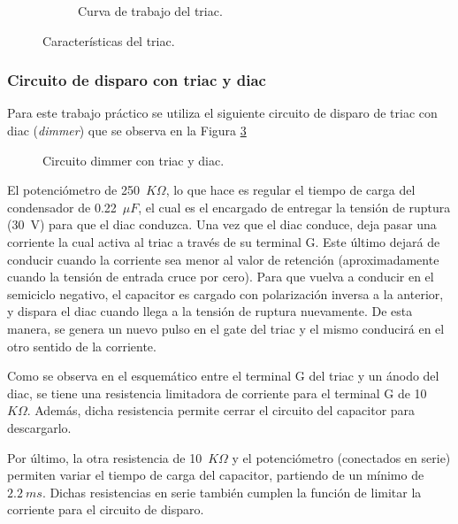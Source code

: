 \begin{figure}[H]
\begin{subfigure}[ht]{0.48\textwidth}
              \caption{Curva de trabajo del triac.}
              \label{fig:CurvaTriac}
            \end{subfigure}  
            \caption{Características del triac.}
            \label{fig:DatosTriac}
        \end{figure}

    \subsubsection{Circuito de disparo con triac y diac}
        
        Para este trabajo práctico se utiliza el siguiente circuito de disparo 
        de triac con diac (\textit{dimmer}) que se observa en la Figura 
        \ref{fig:CircuitoTriacDiac}

        \begin{figure}[H]
            \centering
            \caption{Circuito dimmer con triac y diac.}
            \label{fig:CircuitoTriacDiac}
          \end{figure}

        El potenciómetro de 250~\(K\Omega\), lo que hace es regular el tiempo de carga del condensador 
        de 0.22~\(\mu F\), el cual es el encargado de entregar la tensión de ruptura (30~V) 
        para que el diac conduzca. Una vez que el diac conduce, deja pasar una corriente 
        la cual activa al triac a través de su terminal G. Este último dejará de conducir 
        cuando la corriente sea menor al valor de retención (aproximadamente cuando la 
        tensión de entrada cruce por cero).
        Para que vuelva a conducir en el semiciclo negativo, el capacitor es cargado con
        polarización inversa a la anterior, y dispara el diac cuando llega a la tensión 
        de ruptura nuevamente. De esta manera, se genera un nuevo pulso en el gate del 
        triac y el mismo conducirá en el otro sentido de la corriente.

        Como se observa en el esquemático entre el terminal G del triac y un ánodo del diac, 
        se tiene una resistencia limitadora de corriente para el terminal G de 10~\(K\Omega\).
        Además, dicha resistencia permite cerrar el circuito del capacitor para descargarlo.

        Por último, la otra resistencia de 10~\(K\Omega\) y el potenciómetro 
        (conectados en serie) permiten variar el tiempo de carga del capacitor, partiendo 
        de un mínimo de \(2.2~ms\). Dichas resistencias en serie también cumplen la 
        función de limitar la corriente para el circuito de disparo. 
